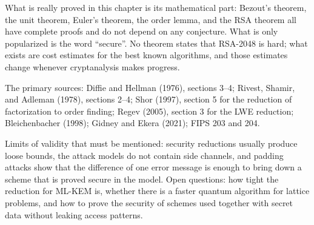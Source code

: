 \begin{untukpeneliti}
What is really proved in this chapter is its mathematical part: Bezout's theorem, the unit theorem,
Euler's theorem, the order lemma, and the RSA theorem all have complete proofs and do not depend on
any conjecture. What is only popularized is the word ``secure''. No theorem states that RSA-2048 is
hard; what exists are cost estimates for the best known algorithms, and those estimates change
whenever cryptanalysis makes progress.

The primary sources: Diffie and Hellman (1976), sections 3--4; Rivest, Shamir, and Adleman (1978),
sections 2--4; Shor (1997), section 5 for the reduction of factorization to order finding; Regev
(2005), section 3 for the LWE reduction; Bleichenbacher (1998); Gidney and Ekera (2021); FIPS 203 and
204.

Limits of validity that must be mentioned: security reductions usually produce loose bounds, the
attack models do not contain side channels, and padding attacks show that the difference of one error
message is enough to bring down a scheme that is proved secure in the model. Open questions: how tight
the reduction for ML-KEM is, whether there is a faster quantum algorithm for lattice problems, and how
to prove the security of schemes used together with secret data without leaking access patterns.
\end{untukpeneliti}

